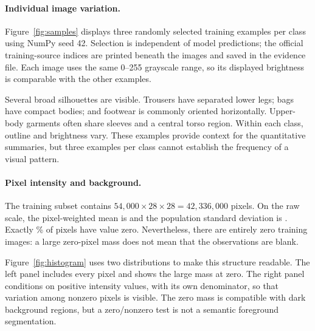 \paragraph{Individual image variation.}
Figure~\ref{fig:samples} displays three randomly selected training examples per
class using NumPy seed 42. Selection is independent of model predictions;
the official training-source indices are printed beneath the images and saved
in the evidence file. Each image uses the same 0--255 grayscale range, so its
displayed brightness is comparable with the other examples.

Several broad silhouettes are visible. Trousers have separated lower legs;
bags have compact bodies; and footwear is commonly oriented horizontally.
Upper-body garments often share sleeves and a central torso region. Within
each class, outline and brightness vary. These examples provide context for
the quantitative summaries, but three examples per class cannot establish the
frequency of a visual pattern.
\FloatBarrier

\paragraph{Pixel intensity and background.}
The training subset contains \(54{,}000\times28\times28=42{,}336{,}000\)
pixels. On the raw scale, the pixel-weighted mean is \RawMean{} and the
population standard deviation is \RawStd{}. Exactly \ZeroPercent\% of pixels
have value zero. Nevertheless, there are \BlankImages{} entirely zero training
images: a large zero-pixel mass does not mean that the observations are blank.

Figure~\ref{fig:histogram} uses two distributions to make this structure readable.
The left panel includes every pixel and shows the large mass at zero. The right
panel conditions on positive intensity values, with its own denominator, so
that variation among nonzero pixels is visible. The zero mass is compatible
with dark background regions, but a zero/nonzero test is not a semantic
foreground segmentation.

